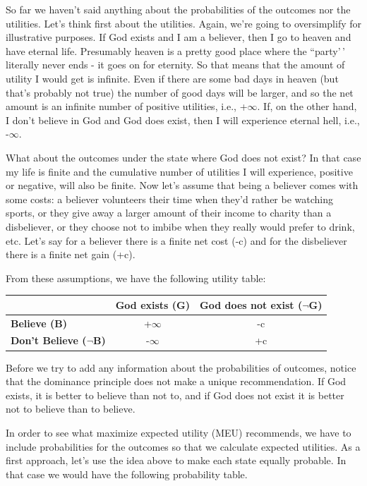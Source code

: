 \documentclass[]{tufte-book}
\begin{document}
So far we haven't said anything about the probabilities of the outcomes nor the utilities. Let's think first about the utilities. Again, we're going to oversimplify for illustrative purposes. If God exists and I am a believer, then I go to heaven and have eternal life. Presumably heaven is a pretty good place where the ``party'\,' literally never ends - it goes on for eternity. So that means that the amount of utility I would get is infinite. Even if there are some bad days in heaven (but that's probably not true) the number of good days will be larger, and so the net amount is an infinite number of positive utilities, i.e., +\(\infty\). If, on the other hand, I don't believe in God and God does exist, then I will experience eternal hell, i.e., -\(\infty\).

What about the outcomes under the state where God does not exist? In that case my life is finite and the cumulative number of utilities I will experience, positive or negative, will also be finite. Now let's assume that being a believer comes with some costs: a believer volunteers their time when they'd rather be watching sports, or they give away a larger amount of their income to charity than a disbeliever, or they choose not to imbibe when they really would prefer to drink, etc. Let's say for a believer there is a finite net cost (-c) and for the disbeliever there is a finite net gain (+c).

From these assumptions, we have the following utility table:

\begin{longtable}[]{@{}lcc@{}}
\toprule
& God exists (G) & God does not exist (\(\neg\)G)\tabularnewline
\midrule
\endhead
\textbf{Believe (B)} & +\(\infty\) & -c\tabularnewline
\textbf{Don't Believe (\(\neg\)B)} & -\(\infty\) & +c\tabularnewline
\bottomrule
\end{longtable}

Before we try to add any information about the probabilities of outcomes, notice that the dominance principle does not make a unique recommendation. If God exists, it is better to believe than not to, and if God does not exist it is better not to believe than to believe.

In order to see what maximize expected utility (MEU) recommends, we have to include probabilities for the outcomes so that we calculate expected utilities. As a first approach, let's use the idea above to make each state equally probable. In that case we would have the following probability table.
\end{document}

